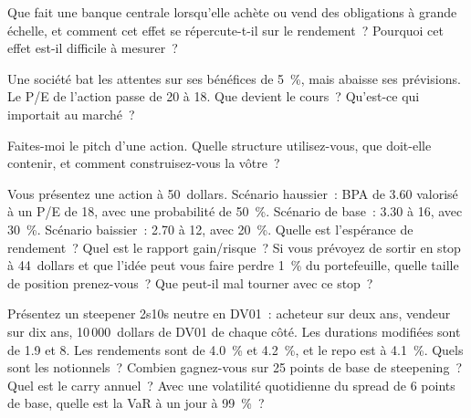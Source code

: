\begin{question}\label{iq:iv2:macro-market-knowledge-and-pitches:15}
Que fait une banque centrale lorsqu'elle achète ou vend des obligations à grande échelle, et comment cet effet se répercute-t-il sur le rendement~? Pourquoi cet effet est-il difficile à mesurer~?
\end{question}

\begin{question}\label{iq:iv2:macro-market-knowledge-and-pitches:16}
Une société bat les attentes sur ses bénéfices de 5~\%, mais abaisse ses prévisions. Le P/E de l'action passe de 20 à 18. Que devient le cours~? Qu'est-ce qui importait au marché~?
\end{question}

\begin{question}\label{iq:iv2:macro-market-knowledge-and-pitches:17}
Faites-moi le pitch d'une action. Quelle structure utilisez-vous, que doit-elle contenir, et comment construisez-vous la vôtre~?
\end{question}

\begin{question}\label{iq:iv2:macro-market-knowledge-and-pitches:18}
Vous présentez une action à 50~dollars. Scénario haussier~: BPA de 3.60 valorisé à un P/E de 18, avec une probabilité de 50~\%. Scénario de base~: 3.30 à 16, avec 30~\%. Scénario baissier~: 2.70 à 12, avec 20~\%. Quelle est l'espérance de rendement~? Quel est le rapport gain/risque~? Si vous prévoyez de sortir en stop à 44~dollars et que l'idée peut vous faire perdre 1~\% du portefeuille, quelle taille de position prenez-vous~? Que peut-il mal tourner avec ce stop~?
\end{question}

\begin{question}\label{iq:iv2:macro-market-knowledge-and-pitches:19}
Présentez un steepener 2s10s neutre en DV01~: acheteur sur deux ans, vendeur sur dix ans, 10\,000~dollars de DV01 de chaque côté. Les durations modifiées sont de 1.9 et 8. Les rendements sont de 4.0~\% et 4.2~\%, et le repo est à 4.1~\%. Quels sont les notionnels~? Combien gagnez-vous sur 25 points de base de steepening~? Quel est le carry annuel~? Avec une volatilité quotidienne du spread de 6 points de base, quelle est la VaR à un jour à 99~\%~?
\end{question}

